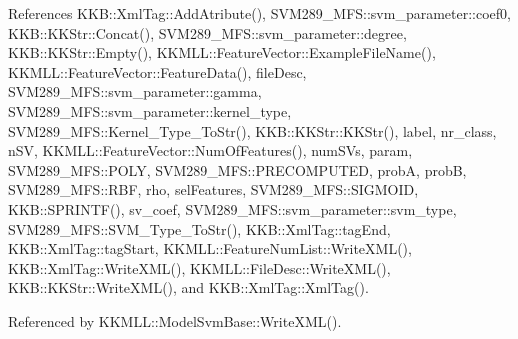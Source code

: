 References K\+K\+B\+::\+Xml\+Tag\+::\+Add\+Atribute(), S\+V\+M289\+\_\+\+M\+F\+S\+::svm\+\_\+parameter\+::coef0, K\+K\+B\+::\+K\+K\+Str\+::\+Concat(), S\+V\+M289\+\_\+\+M\+F\+S\+::svm\+\_\+parameter\+::degree, K\+K\+B\+::\+K\+K\+Str\+::\+Empty(), K\+K\+M\+L\+L\+::\+Feature\+Vector\+::\+Example\+File\+Name(), K\+K\+M\+L\+L\+::\+Feature\+Vector\+::\+Feature\+Data(), file\+Desc, S\+V\+M289\+\_\+\+M\+F\+S\+::svm\+\_\+parameter\+::gamma, S\+V\+M289\+\_\+\+M\+F\+S\+::svm\+\_\+parameter\+::kernel\+\_\+type, S\+V\+M289\+\_\+\+M\+F\+S\+::\+Kernel\+\_\+\+Type\+\_\+\+To\+Str(), K\+K\+B\+::\+K\+K\+Str\+::\+K\+K\+Str(), label, nr\+\_\+class, n\+SV, K\+K\+M\+L\+L\+::\+Feature\+Vector\+::\+Num\+Of\+Features(), num\+S\+Vs, param, S\+V\+M289\+\_\+\+M\+F\+S\+::\+P\+O\+LY, S\+V\+M289\+\_\+\+M\+F\+S\+::\+P\+R\+E\+C\+O\+M\+P\+U\+T\+ED, probA, probB, S\+V\+M289\+\_\+\+M\+F\+S\+::\+R\+BF, rho, sel\+Features, S\+V\+M289\+\_\+\+M\+F\+S\+::\+S\+I\+G\+M\+O\+ID, K\+K\+B\+::\+S\+P\+R\+I\+N\+T\+F(), sv\+\_\+coef, S\+V\+M289\+\_\+\+M\+F\+S\+::svm\+\_\+parameter\+::svm\+\_\+type, S\+V\+M289\+\_\+\+M\+F\+S\+::\+S\+V\+M\+\_\+\+Type\+\_\+\+To\+Str(), K\+K\+B\+::\+Xml\+Tag\+::tag\+End, K\+K\+B\+::\+Xml\+Tag\+::tag\+Start, K\+K\+M\+L\+L\+::\+Feature\+Num\+List\+::\+Write\+X\+M\+L(), K\+K\+B\+::\+Xml\+Tag\+::\+Write\+X\+M\+L(), K\+K\+M\+L\+L\+::\+File\+Desc\+::\+Write\+X\+M\+L(), K\+K\+B\+::\+K\+K\+Str\+::\+Write\+X\+M\+L(), and K\+K\+B\+::\+Xml\+Tag\+::\+Xml\+Tag().



Referenced by K\+K\+M\+L\+L\+::\+Model\+Svm\+Base\+::\+Write\+X\+M\+L().


